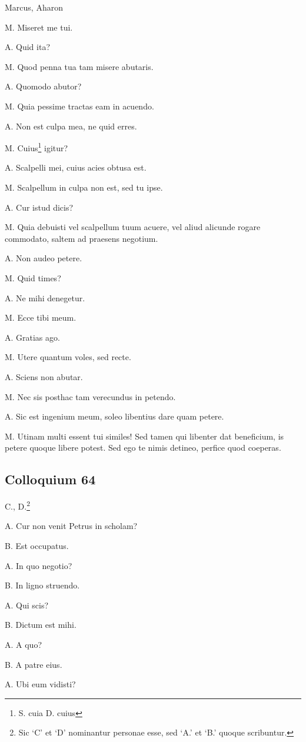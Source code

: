 \documentclass{article}
\begin{document}
Marcus, Aharon

M. Miseret me tui.

A. Quid ita?

M. Quod penna tua tam misere abutaris.

A. Quomodo abutor?

M. Quia pessime tractas eam in acuendo.

A. Non est culpa mea, ne quid erres.

M. Cuius\footnote{S. cuia D. cuius} igitur?

A. Scalpelli mei, cuius acies obtusa est.

M. Scalpellum in culpa non est, sed tu ipse.

A. Cur istud dicis?

M. Quia debuisti vel scalpellum tuum acuere, vel aliud alicunde rogare commodato, saltem ad praesens negotium.

A. Non audeo petere.

M. Quid times?

A. Ne mihi denegetur.

M. Ecce tibi meum.

A. Gratias ago.

M. Utere quantum voles, sed recte.

A. Sciens non abutar.

M. Nec sis posthac tam verecundus in petendo.

A. Sic est ingenium meum, soleo libentius dare quam petere.

M. Utinam multi essent tui similes! Sed tamen qui libenter dat beneficium, is petere quoque libere potest. Sed ego te nimis detineo, perfice quod coeperas.

\subsection{Colloquium 64}
C., D.\footnote{Sic `C' et `D' nominantur personae esse, sed `A.' et `B.' quoque scribuntur.}

A. Cur non venit Petrus in scholam?

B. Est occupatus.

A. In quo negotio?

B. In ligno struendo.

A. Qui scis?

B. Dictum est mihi.

A. A quo?

B. A patre eius.

A. Ubi eum vidisti?
\end{document}
